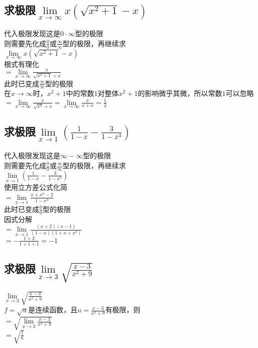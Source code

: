 \documentclass{article}
\begin{document}
\begin{flushleft}
\subsection{
求极限$\lim\limits_{x\to \infty}x(\sqrt{x^2+1}-x)$
}
代入极限发现这是$0\cdot\infty$型的极限\\
则需要先化成$\frac{0}{0}$或$\frac{\infty}{\infty}$型的极限，再继续求\\
$\lim\limits_{x\to \infty}x(\sqrt{x^2+1}-x)$\\
根式有理化\\
$=\lim\limits_{x\to \infty}\frac{x}{\sqrt{x^2+1}+x}$\\
此时已变成$\frac{\infty}{\infty}$型的极限\\
在$x\to\infty$时，$x^2+1$中的常数$1$对整体$x^2+1$的影响微乎其微，所以常数$1$可以忽略\\
$=\lim\limits_{x\to \infty}\frac{x}{\sqrt{x^2}+x}
=\lim\limits_{x\to \infty}\frac{x}{x+x}=\frac{1}{2}$\\

\subsection{
	求极限$\lim\limits_{x\to 1}(\frac{1}{1-x}-\frac{3}{1-x^3})$
}
代入极限发现这是$\infty-\infty$型的极限\\
则需要先化成$\frac{0}{0}$或$\frac{\infty}{\infty}$型的极限，再继续求\\
$\lim\limits_{x\to 1}(\frac{1}{1-x}-\frac{3}{1-x^3})$\\
使用立方差公式化简\\
$=\lim\limits_{x\to 1}\frac{x+x^2-2}{1-x^3}$\\
此时已变成$\frac{0}{0}$型的极限\\
因式分解\\
$=\lim\limits_{x\to 1}\frac{(x+2)(x-1)}{(1-x)(1+x+x^2)}$\\
$=-\frac{1+2}{1+1+1}=-1$\\

\subsection{
	求极限$\lim\limits_{x\to 3}\sqrt{\frac{x-3}{x^2+9}}$
}
$\lim\limits_{x\to 3}\sqrt{\frac{x-3}{x^2+9}}$\\
$f=\sqrt{u}$是连续函数，且$u=\frac{x-3}{x^2+9}$有极限，则\\
$=\sqrt{\lim\limits_{x\to 3}\frac{x-3}{x^2+9}}$\\
$=\sqrt{\frac{1}{6}}$\\


\end{flushleft}
\end{document}
